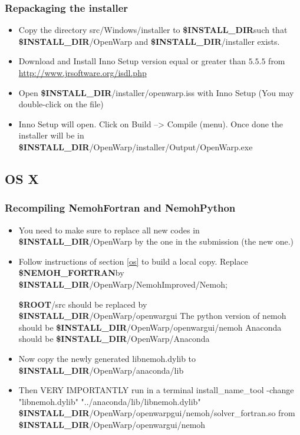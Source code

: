 \documentclass[12pt]{article}
\newcommand{\ROOT}{{\textbf{\$ROOT}}}
\newcommand{\NEMOHFORTRAN}{{\textbf{\$NEMOH{\_}FORTRAN}}}
\newcommand{\INSTALLDIR}{{\textbf{\$INSTALL{\_}DIR}}}
\begin{document}
\subsubsection{Repackaging the installer}
\begin{itemize}
	\item Copy the directory src/Windows/installer to \INSTALLDIR such that \INSTALLDIR/OpenWarp and \INSTALLDIR/installer exists.
\item Download and Install Inno Setup version equal or greater than $5.5.5$ from \url{http://www.jrsoftware.org/isdl.php}
\item Open \INSTALLDIR/installer/openwarp.iss with Inno Setup (You may double-click on the file)
\item Inno Setup will open. Click on Build --> Compile (menu). Once done the installer will be in
\INSTALLDIR/OpenWarp/installer/Output/OpenWarp.exe
\end{itemize}

\subsection{OS X}

\subsubsection{Recompiling NemohFortran and NemohPython}

\begin{itemize}
	
	 	\item You need to make sure to replace all new codes in \INSTALLDIR/OpenWarp by the one in the submission (the new one.)
	 	\item Follow instructions of section \ref*{os} to build a local copy.
	 	Replace \NEMOHFORTRAN by \INSTALLDIR/OpenWarp/NemohImproved/Nemoh;
	 	
	 	\ROOT/src should be replaced by \INSTALLDIR/OpenWarp/openwargui
	 	The python version of nemoh should be \INSTALLDIR/OpenWarp/openwargui/nemoh Anaconda should be \INSTALLDIR/OpenWarp/Anaconda
 \item Now copy the newly generated libnemoh.dylib to \INSTALLDIR/OpenWarp/anaconda/lib
\item Then {\color{red} VERY IMPORTANTLY} run in a terminal
 {\color{blue} install{\_}name{\_}tool -change "libnemoh.dylib" "../anaconda/lib/libnemoh.dylib" \INSTALLDIR/OpenWarp/openwarpgui/nemoh/solver{\_}fortran.so}  from \INSTALLDIR/OpenWarp/openwargui/nemoh
	
\end{itemize}
\end{document}
